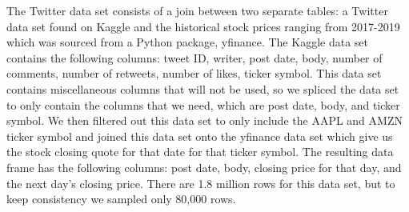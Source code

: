 \documentclass[conference]{IEEEtran}
\begin{document}
The Twitter data set consists of a join between two separate tables: a Twitter data set found on Kaggle and the historical stock prices ranging from 2017-2019 which was sourced from a Python package, yfinance. The Kaggle data set contains the following columns: tweet ID, writer, post date, body, number of comments, number of retweets, number of likes, ticker symbol. This data set contains miscellaneous columns that will not be used, so we spliced the data set to only contain the columns that we need, which are post date, body, and ticker symbol. We then filtered out this data set to only include the AAPL and AMZN ticker symbol and joined this data set onto the yfinance data set which give us the stock closing quote for that date for that ticker symbol. The resulting data frame has the following columns: post date, body, closing price for that day, and the next day's closing price. There are 1.8 million rows for this data set, but to keep consistency we sampled only 80,000 rows.
\end{document}

